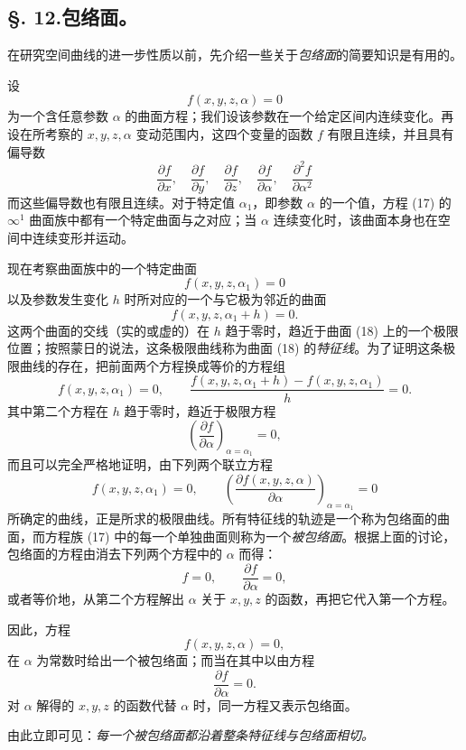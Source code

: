 \subsection*{\S. 12.\quad 包络面。}
在研究空间曲线的进一步性质以前，先介绍一些关于\emph{包络面}的简要知识是有用的。

设
\begin{equation}\tag{17}
f(x,y,z,\alpha)=0
\end{equation}
为一个含任意参数 \(\alpha\) 的曲面方程；我们设该参数在一个给定区间内连续变化。再设在所考察的 \(x,y,z,\alpha\) 变动范围内，这四个变量的函数 \(f\) 有限且连续，并且具有偏导数
\[
\frac{\partial f}{\partial x},\quad
\frac{\partial f}{\partial y},\quad
\frac{\partial f}{\partial z},\quad
\frac{\partial f}{\partial\alpha},\quad
\frac{\partial^2 f}{\partial\alpha^2}
\]
而这些偏导数也有限且连续。对于特定值 \(\alpha_1\)，即参数 \(\alpha\) 的一个值，方程 (17) 的 \(\infty^1\) 曲面族中都有一个特定曲面与之对应；当 \(\alpha\) 连续变化时，该曲面本身也在空间中连续变形并运动。

现在考察曲面族中的一个特定曲面
\begin{equation}\tag{18}
f(x,y,z,\alpha_1)=0
\end{equation}
以及参数发生变化 \(h\) 时所对应的一个与它极为邻近的曲面
\[
f(x,y,z,\alpha_1+h)=0.
\]
这两个曲面的交线（实的或虚的）在 \(h\) 趋于零时，趋近于曲面 (18) 上的一个极限位置；按照蒙日的说法，这条极限曲线称为曲面 (18) 的\emph{特征线}。为了证明这条极限曲线的存在，把前面两个方程换成等价的方程组
\[
f(x,y,z,\alpha_1)=0,
\qquad
\frac{f(x,y,z,\alpha_1+h)-f(x,y,z,\alpha_1)}{h}=0.
\]
其中第二个方程在 \(h\) 趋于零时，趋近于极限方程
\[
\left(\frac{\partial f}{\partial\alpha}\right)_{\alpha=\alpha_1}=0,
\]
而且可以完全严格地证明，由下列两个联立方程
\[
f(x,y,z,\alpha_1)=0,
\qquad
\left(\frac{\partial f(x,y,z,\alpha)}{\partial\alpha}\right)_{\alpha=\alpha_1}=0
\]
所确定的曲线，正是所求的极限曲线。所有特征线的轨迹是一个称为包络面的曲面，而方程族 (17) 中的每一个单独曲面则称为一个\emph{被包络面}。根据上面的讨论，包络面的方程由消去下列两个方程中的 \(\alpha\) 而得：
\[
f=0,
\qquad
\frac{\partial f}{\partial\alpha}=0,
\]
或者等价地，从第二个方程解出 \(\alpha\) 关于 \(x,y,z\) 的函数，再把它代入第一个方程。

因此，方程
\[
f(x,y,z,\alpha)=0,
\]
在 \(\alpha\) 为常数时给出一个被包络面；而当在其中以由方程
\[
\frac{\partial f}{\partial\alpha}=0.
\]
对 \(\alpha\) 解得的 \(x,y,z\) 的函数代替 \(\alpha\) 时，同一方程又表示包络面。

由此立即可见：\emph{每一个被包络面都沿着整条特征线与包络面相切。}

